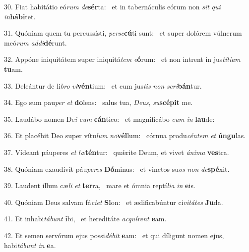 30. Fiat habitátio eó\textit{rum} \textit{de}\textbf{sér}ta: \ast\  et in tabernáculis eórum non \textit{sit} \textit{qui} \textit{in}\textbf{há}\textbf{bi}tet.\

31. Quóniam quem tu percussísti, \textit{per}\textit{se}\textbf{cú}ti sunt: \ast\  et super dolórem vúlnerum meó\textit{rum} \textit{ad}\textit{di}\textbf{dé}runt.\

32. Appóne iniquitátem super iniquitá\textit{tem} \textit{e}\textbf{ó}rum: \ast\  et non intrent in jus\textit{tí}\textit{ti}\textit{am} \textbf{tu}am.\

33. Deleántur de li\textit{bro} \textit{vi}\textbf{vén}tium: \ast\  et cum jus\textit{tis} \textit{non} \textit{scri}\textbf{bán}tur.\

34. Ego sum pau\textit{per} \textit{et} \textbf{do}lens: \ast\  salus tua, \textit{De}\textit{us}, \textit{su}\textbf{scé}\textbf{pit} me.\

35. Laudábo nomen De\textit{i} \textit{cum} \textbf{cán}tico: \ast\  et magnificábo \textit{e}\textit{um} \textit{in} \textbf{lau}de:\

36. Et placébit Deo super vítu\textit{lum} \textit{no}\textbf{vél}lum: \ast\  córnua produ\textit{cén}\textit{tem} \textit{et} \textbf{ún}\textbf{gu}las.\

37. Vídeant páuperes \textit{et} \textit{læ}\textbf{tén}tur: \ast\  quǽrite Deum, et vivet \textit{á}\textit{ni}\textit{ma} \textbf{ves}tra.\

38. Quóniam exaudívit páu\textit{pe}\textit{res} \textbf{Dó}minus: \ast\  et vinctos su\textit{os} \textit{non} \textit{de}\textbf{spé}xit.\

39. Laudent illum cæ\textit{li} \textit{et} \textbf{ter}ra, \ast\  mare et ómnia reptí\textit{li}\textit{a} \textit{in} \textbf{e}is.\

40. Quóniam Deus salvam fá\textit{ci}\textit{et} \textbf{Si}on: \ast\  et ædificabúntur ci\textit{vi}\textit{tá}\textit{tes} \textbf{Ju}da.\

41. Et inhabi\textit{tá}\textit{bunt} \textbf{i}bi, \ast\  et hereditáte \textit{ac}\textit{quí}\textit{rent} \textbf{e}am.\

42. Et semen servórum ejus possi\textit{dé}\textit{bit} \textbf{e}am: \ast\  et qui díligunt nomen ejus, habi\textit{tá}\textit{bunt} \textit{in} \textbf{e}a.\

